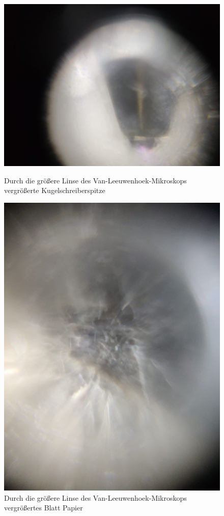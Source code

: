 \documentclass[ngerman]{scrartcl}
\begin{document}
\begin{figure}[H]
    \centering
    \begin{minipage}[b]{0.475\linewidth}
        \centering
        \includegraphics[width=\linewidth]{fig/Kulli.jpeg}
        \caption[Kugelschreiberspitze Van-Leeuwenhoek]{Durch die größere Linse des Van-Leeuwenhoek-Mikroskops vergrößerte Kugelschreiberspitze}
        \label{fig:vanleeuwenhoek_kugelschreiber}
    \end{minipage}%
    \hspace*{\fill}
    \begin{minipage}[t]{0.475\linewidth}
        \centering
        \includegraphics[width=0.75\linewidth]{fig/papier_gross.jpeg}
        \caption[Blatt Papier Van-Leeuwenhoek]{Durch die größere Linse des Van-Leeuwenhoek-Mikroskops vergrößertes Blatt Papier}
        \label{fig:vanleeuwenhoek_papier}
    \end{minipage}
\end{figure}
\end{document}
